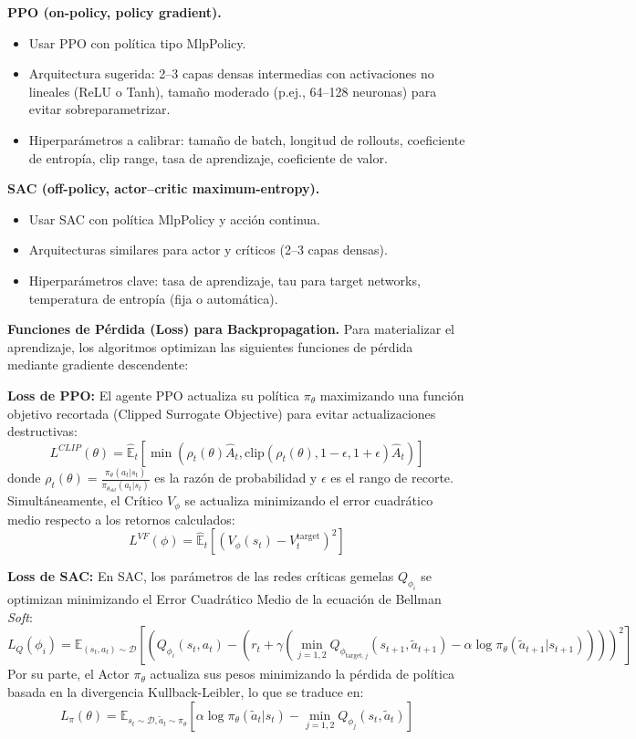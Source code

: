 \documentclass[12pt]{article}
\begin{document}
\textbf{PPO (on-policy, policy gradient).}
\begin{itemize}
    \item Usar PPO con política tipo MlpPolicy.
    \item Arquitectura sugerida: 2–3 capas densas intermedias con activaciones no lineales (ReLU o Tanh), tamaño moderado (p.ej., 64–128 neuronas) para evitar sobreparametrizar.
    \item Hiperparámetros a calibrar: tamaño de batch, longitud de rollouts, coeficiente de entropía, clip range, tasa de aprendizaje, coeficiente de valor.
\end{itemize}

\textbf{SAC (off-policy, actor–critic maximum-entropy).}
\begin{itemize}
    \item Usar SAC con política MlpPolicy y acción continua.
    \item Arquitecturas similares para actor y críticos (2–3 capas densas).
    \item Hiperparámetros clave: tasa de aprendizaje, tau para target networks, temperatura de entropía (fija o automática).
\end{itemize}


\textbf{Funciones de Pérdida (Loss) para Backpropagation.}
Para materializar el aprendizaje, los algoritmos optimizan las siguientes funciones de pérdida mediante gradiente descendente:

\textbf{Loss de PPO:}
El agente PPO actualiza su política $\pi_\theta$ maximizando una función objetivo recortada (Clipped Surrogate Objective) para evitar actualizaciones destructivas:
$$L^{CLIP}(\theta) = \hat{\mathbb{E}}_t \left[ \min\left( \rho_t(\theta) \hat{A}_t, \text{clip}(\rho_t(\theta), 1-\epsilon, 1+\epsilon) \hat{A}_t \right) \right]$$
donde $\rho_t(\theta) = \frac{\pi_\theta(a_t | s_t)}{\pi_{\theta_{old}}(a_t | s_t)}$ es la razón de probabilidad y $\epsilon$ es el rango de recorte. Simultáneamente, el Crítico $V_\phi$ se actualiza minimizando el error cuadrático medio respecto a los retornos calculados:
$$L^{VF}(\phi) = \hat{\mathbb{E}}_t \left[ \left( V_\phi(s_t) - V_t^{\text{target}} \right)^2 \right]$$

\textbf{Loss de SAC:}
En SAC, los parámetros de las redes críticas gemelas $Q_{\phi_i}$ se optimizan minimizando el Error Cuadrático Medio de la ecuación de Bellman \textit{Soft}:
$$L_Q(\phi_i) = \mathbb{E}_{(s_t, a_t) \sim \mathcal{D}} \left[ \left( Q_{\phi_i}(s_t, a_t) - \left( r_t + \gamma \left( \min_{j=1,2} Q_{\phi_{\text{target}, j}}(s_{t+1}, \tilde{a}_{t+1}) - \alpha \log \pi_\theta(\tilde{a}_{t+1} | s_{t+1}) \right) \right) \right)^2 \right]$$
Por su parte, el Actor $\pi_\theta$ actualiza sus pesos minimizando la pérdida de política basada en la divergencia Kullback-Leibler, lo que se traduce en:
$$L_\pi(\theta) = \mathbb{E}_{s_t \sim \mathcal{D}, \tilde{a}_t \sim \pi_\theta} \left[ \alpha \log \pi_\theta(\tilde{a}_t | s_t) - \min_{j=1,2} Q_{\phi_j}(s_t, \tilde{a}_t) \right]$$
\end{document}
